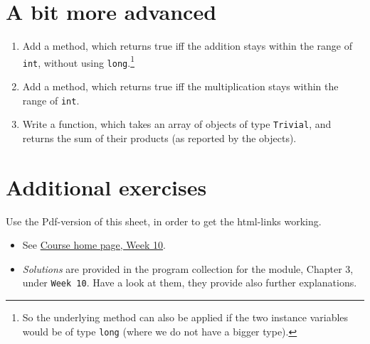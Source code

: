 \documentclass[11pt]{article}
\begin{document}
\section{A bit more advanced}
\label{sec:advanced}

\begin{enumerate}
\item Add a method, which returns true iff the addition stays within the range of \texttt{int}, without using \texttt{long}.\footnote{So the underlying method can also be applied if the two instance variables would be of type \texttt{long} (where we do not have a bigger type).}
\item Add a method, which returns true iff the multiplication stays within the range of \texttt{int}.
\item Write a function, which takes an array of objects of type \texttt{Trivial}, and returns the sum of their products (as reported by the objects).
\end{enumerate}


\section{Additional exercises}
\label{sec:addex}

Use the Pdf-version of this sheet, in order to get the html-links working.
\begin{itemize}
\item See \href{\chp#ExercisesWeek10}{Course home page, Week 10}.
\item \emph{Solutions} are provided in the program collection for the module, Chapter 3, under \texttt{Week 10}. Have a look at them, they provide also further explanations.
\end{itemize}
\end{document}
